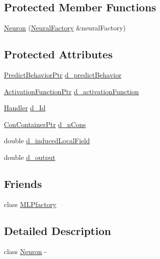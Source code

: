\subsection*{Protected Member Functions}
\begin{DoxyCompactItemize}
\item 
\hyperlink{class_neuron_a814666c8dc635e30659aa95cc4886e5f}{Neuron} (\hyperlink{class_neural_factory}{NeuralFactory} \&neuralFactory)
\end{DoxyCompactItemize}
\subsection*{Protected Attributes}
\begin{DoxyCompactItemize}
\item 
\hyperlink{_a_m_o_r_e_8h_a1fb2f1f8fdf1e08c42ef4bdce436af93}{PredictBehaviorPtr} \hyperlink{class_neuron_a2522e221f58c84bd3a1c32647da4a411}{d\_\-predictBehavior}
\item 
\hyperlink{_a_m_o_r_e_8h_a77602a0277a02e5769c3df0adc669b17}{ActivationFunctionPtr} \hyperlink{class_neuron_ad530e9f0bb556e0469b5074e6b7f463f}{d\_\-activationFunction}
\item 
\hyperlink{_a_m_o_r_e_8h_abc871abb71cff6655b8172ee7240b8ef}{Handler} \hyperlink{class_neuron_ab1a34e30b663c41342e8f8eaac8bd466}{d\_\-Id}
\item 
\hyperlink{_a_m_o_r_e_8h_a1021dbaf961d1c8da6d58a8566e5778b}{ConContainerPtr} \hyperlink{class_neuron_ac3cb61c8582bb07bb3c61fe9fa07489b}{d\_\-nCons}
\item 
double \hyperlink{class_neuron_a4370eae5b594fb4c7f544fcefa298c7c}{d\_\-inducedLocalField}
\item 
double \hyperlink{class_neuron_a1e0b130755580b323da98c5332a6610e}{d\_\-output}
\end{DoxyCompactItemize}
\subsection*{Friends}
\begin{DoxyCompactItemize}
\item 
class \hyperlink{class_neuron_a1aa48940238b9487734e590ffab33a1b}{MLPfactory}
\end{DoxyCompactItemize}


\subsection{Detailed Description}
class \hyperlink{class_neuron}{Neuron} -\/ 

